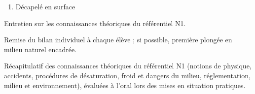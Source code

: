 {\begin{description}[leftmargin=0.7cm]
\begin{description}[leftmargin=1.5cm]
\begin{enumerate}
          \item Décapelé en surface
        \end{enumerate}
      \item[3. Orale] Entretien sur les connaissances théoriques du référentiel N1.
    \end{description}
    Remise du bilan individuel à chaque élève ; si possible, première plongée en milieu
    naturel encadrée.
  \item[Théorie] Récapitulatif des connaissances théoriques du référentiel N1 (notions de
    physique, accidents, procédures de désaturation, froid et dangers du milieu,
    réglementation, milieu et environnement), évaluées à l'oral lors des mises en
    situation pratiques.
\end{description}
}
